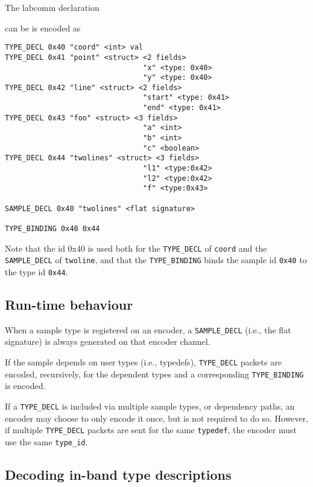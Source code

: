 \documentclass[a4paper]{article}
\begin{document}
The labcomm declaration

can be is encoded as
\begin{lstlisting}[basicstyle=\footnotesize\ttfamily]
TYPE_DECL 0x40 "coord" <int> val
TYPE_DECL 0x41 "point" <struct> <2 fields> 
                                "x" <type: 0x40> 
                                "y" <type: 0x40>
TYPE_DECL 0x42 "line" <struct> <2 fields> 
                                "start" <type: 0x41> 
                                "end" <type: 0x41>
TYPE_DECL 0x43 "foo" <struct> <3 fields> 
                                "a" <int> 
                                "b" <int> 
                                "c" <boolean>
TYPE_DECL 0x44 "twolines" <struct> <3 fields> 
                                "l1" <type:0x42> 
                                "l2" <type:0x42> 
                                "f" <type:0x43>

SAMPLE_DECL 0x40 "twolines" <flat signature>

TYPE_BINDING 0x40 0x44
\end{lstlisting}

Note that the id 0x40 is used both for the \verb+TYPE_DECL+ of
\verb+coord+ and the \verb+SAMPLE_DECL+ of \verb+twoline+, and that the
\verb+TYPE_BINDING+ binds the sample id \verb+0x40+ to the type id
\verb+0x44+.

\subsection{Run-time behaviour}

When a sample type is registered on an encoder, a \verb+SAMPLE_DECL+
(i.e., the flat signature) is always generated on that encoder channel.

If the sample depends on user types (i.e., typedefs), \verb+TYPE_DECL+
packets are encoded, recursively, for the dependent types and a 
corresponding \verb+TYPE_BINDING+ is encoded.

If a \verb+TYPE_DECL+ is included via multiple sample types, or
dependency paths, an encoder may choose to only encode it once, but is
not required to do so. However, if multiple \verb+TYPE_DECL+ packets are
sent for the same \verb+typedef+, the encoder must use the same
\verb+type_id+.

\subsection{Decoding in-band type descriptions}
\end{document}
